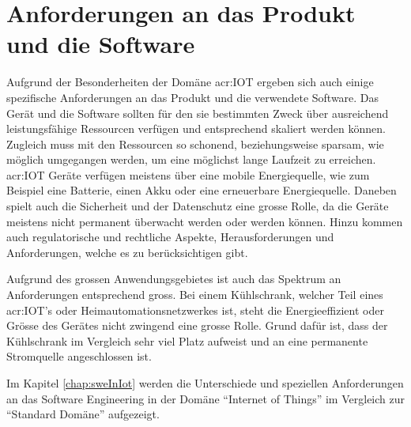 \section{Anforderungen an das Produkt und die Software}
Aufgrund der Besonderheiten der Domäne \gls{acr:IOT} ergeben sich auch einige spezifische Anforderungen an das Produkt und die verwendete Software. Das Gerät und die Software sollten für den sie bestimmten Zweck über ausreichend leistungsfähige Ressourcen verfügen und entsprechend skaliert werden können.  Zugleich muss mit den Ressourcen so schonend, beziehungsweise sparsam, wie möglich umgegangen werden, um eine möglichst lange Laufzeit zu erreichen. \gls{acr:IOT} Geräte verfügen meistens über eine mobile Energiequelle, wie zum Beispiel eine Batterie, einen Akku oder eine erneuerbare Energiequelle. Daneben spielt auch die Sicherheit und der Datenschutz eine grosse Rolle, da die Geräte meistens nicht permanent überwacht werden oder werden können. Hinzu kommen auch regulatorische und rechtliche Aspekte, Herausforderungen und Anforderungen, welche es zu berücksichtigen gibt.

Aufgrund des grossen Anwendungsgebietes ist auch das Spektrum an Anforderungen entsprechend gross. Bei einem Kühlschrank, welcher Teil eines \gls{acr:IOT}'s oder Heimautomationsnetzwerkes ist, steht die Energieeffizient oder Grösse des Gerätes nicht zwingend eine grosse Rolle. Grund dafür ist, dass der Kühlschrank im Vergleich sehr viel Platz aufweist und an eine permanente Stromquelle angeschlossen ist.

Im Kapitel \ref{chap:sweInIot}  werden die Unterschiede und speziellen Anforderungen an das Software Engineering in der Domäne "`Internet of Things"' im Vergleich zur "`Standard Domäne"' aufgezeigt.
